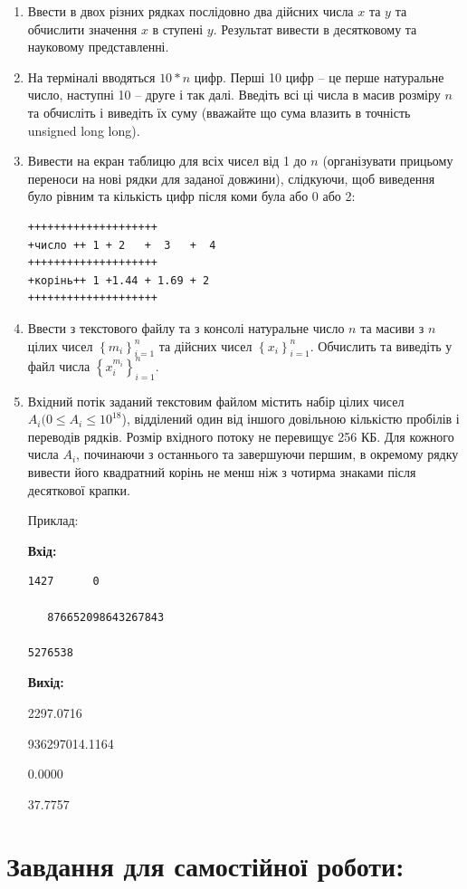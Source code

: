 \documentclass[a5paper,titlepage,openany,twoside,draft]{book_unv}%
\begin{document}
\begin{enumerate}
\def\labelenumi{\arabic{enumi})}
\item
  Ввести в двох різних рядках послідовно два дійсних числа $x$ та $y$ та
  обчислити значення $x$ в ступені $y$. Результат вивести в десятковому та
  науковому представленні.
\item
  На терміналі вводяться $10*n$ цифр. Перші 10 цифр -- це перше натуральне
  число, наступні 10 -- друге і так далі. Введіть всі ці числа в масив
  розміру $n$ та обчисліть і виведіть їх суму (вважайте що сума влазить в
  точність unsigned long long).
\item
  Вивести на екран таблицю для всіх чисел від 1 до $n$ 
 (організувати прицьому переноси на нові рядки для заданої довжини), 
  слідкуючи, щоб виведення було рівним та кількість цифр після коми була або 0 або 2:
\begin{verbatim}
++++++++++++++++++++   
+число ++ 1 + 2   +  3   +  4 
++++++++++++++++++++ 
+корінь++ 1 +1.44 + 1.69 + 2  
++++++++++++++++++++  
\end{verbatim}
\item
  Ввести з текстового файлу та з консолі натуральне число $n$ та масиви з
  $n$ цілих чисел \(\left\{ m_{i} \right\}_{i = 1}^{n}\) та дійсних чисел
  \(\left\{ x_{i} \right\}_{i = 1}^{n}\). Обчислить та виведіть у файл
  числа \(\left\{ x_{i}^{m_{i}} \right\}_{i = 1}^{n}\).
\item
  Вхідний потік заданий текстовим файлом містить набір цілих чисел $A_i (0
  \le A_i \le 10^{18}$), відділений один від іншого довільною кількістю пробілів
  і переводів рядків. Розмір вхідного потоку не перевищує 256 КБ. Для
  кожного числа $A_i$, починаючи з останнього та завершуючи першим, в
  окремому рядку вивести його квадратний корінь не менш ніж з чотирма
  знаками після десяткової крапки.

Приклад:

\textbf{Вхід:}
\begin{verbatim}
1427      0

   876652098643267843

5276538
\end{verbatim}
\textbf{Вихід: }

2297.0716

936297014.1164

0.0000

37.7757

\end{enumerate}

\section{Завдання для самостійної роботи:}
\end{document}
